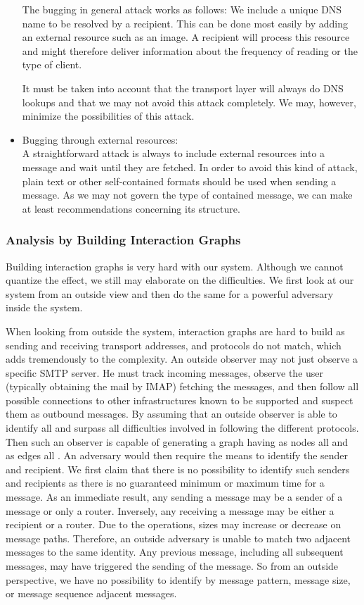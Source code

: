 \begin{itemize}
	The bugging in general attack works as follows: We include a unique DNS name to be resolved by a recipient. This can be done most easily by adding an external resource such as an image. A recipient will process this resource and might therefore deliver information about the frequency of reading or the type of client. 
	
	It must be taken into account that the transport layer will always do DNS lookups and that we may not avoid this attack completely. We may, however, minimize the possibilities of this attack.
	
	\item Bugging through external resources:\\
	A straightforward attack is always to include external resources into a message and wait until they are fetched. In order to avoid this kind of attack, plain text or other self-contained formats should be used when sending a message. As we may not govern the type of contained message, we can make at least recommendations concerning its structure.
\end{itemize}

\subsubsection{Analysis by Building Interaction Graphs\label{sec:analysisInteractionGraphs}}
Building interaction graphs is very hard with our system. Although we cannot quantize the effect, we still may elaborate on the difficulties. We first look at our system from an outside view and then do the same for a powerful adversary inside the system.

When looking from outside the system, interaction graphs are hard to build as sending and receiving transport addresses, and protocols do not match, which adds tremendously to the complexity. An outside observer may not just observe a specific SMTP server. He must track incoming messages, observe the user (typically obtaining the mail by IMAP) fetching the messages, and then follow all possible connections to other infrastructures known to be supported and suspect them as outbound messages. By assuming that an outside observer is able to identify all \VortexMessages{} and surpass all difficulties involved in following the different protocols. Then such an observer is capable of generating a graph having as nodes all \VortexNodes{} and as edges all \VortexMessages{}. An adversary would then require the means to identify the sender and recipient. We first claim that there is no possibility to identify such senders and recipients as there is no guaranteed minimum or maximum time for a message. As an immediate result, any \VortexNode{} sending a message may be a sender of a message or only a router. Inversely, any \VortexNode{} receiving a message may be either a recipient or a router. Due to the operations, sizes may increase or decrease on message paths. Therefore, an outside adversary is unable to match two adjacent messages to the same identity. Any previous message, including all subsequent messages, may have triggered the sending of the message. So from an outside perspective, we have no possibility to identify by message pattern, message size, or message sequence adjacent messages.

